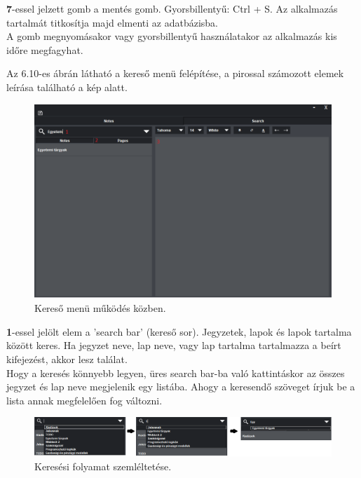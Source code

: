 \vspace{5pt} \noindent \textbf{7}-essel jelzett gomb a mentés gomb. Gyorsbillentyű: Ctrl + S. Az alkalmazás tartalmát titkosítja majd elmenti az adatbázisba.
\\A gomb megnyomásakor vagy gyorsbillentyű használatakor az alkalmazás kis időre megfagyhat.




\newpage {}

Az 6.10-es ábrán látható a kereső menü felépítése, a pirossal számozott elemek leírása található a kép alatt.

\begin{figure}[h]
	\centering
	\includegraphics[scale=0.5]{images/doc_4.png}
	\caption{Kereső menü működés közben.}
	\label{fig:menu_search_2}
\end{figure}

\vspace{5pt} \noindent \textbf{1}-essel jelölt elem a ’search bar’ (kereső sor). Jegyzetek, lapok és lapok tartalma között keres. Ha jegyzet neve, lap neve, vagy lap tartalma tartalmazza a beírt kifejezést, akkor lesz találat. 
\vspace{5pt} \\Hogy a keresés könnyebb legyen, üres search bar-ba való kattintáskor az összes jegyzet és lap neve megjelenik egy listába. Ahogy a keresendő szöveget írjuk be a lista annak megfelelően fog változni. 

\begin{figure}[h]
	\centering
	\includegraphics[scale=0.4]{images/doc_5.png}
	\caption{Keresési folyamat szemléltetése.}
	\label{fig:menu_search_searchBar}
\end{figure}
	
